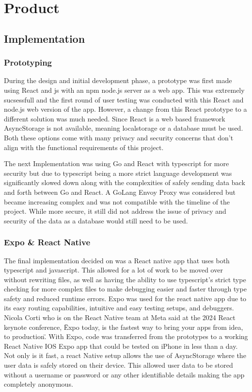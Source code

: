 \section{Product}\label{product}

\subsection{Implementation}

\subsubsection{Prototyping}
During the design and initial development phase, a prototype was first made using React and js with an npm node.js server as a web app. This was extremely sucsessfull and the first round of user testing was conducted with this React and node.js web version of the app. However, a change from this React prototype to a different solution was much needed. Since React is a web based framework AsyncStorage is not available, meaning localstorage or a database must be used. Both these options come with many privacy and security concerns that don't align with the functional requirements of this project.

The next Implementation was using Go and React with typescript for more security but due to typescript being a more strict language development was significantly slowed down along with the complexities of safely sending data back and forth between Go and React. A GoLang Envoy Proxy was considered but became increasing complex and was not compatible with the timeline of the project. While more secure, it still did not address the issue of privacy and security of the data as a database would still need to be used.

\subsubsection{Expo \& React Native}
The final implementation decided on was a React native app that uses both typescript and javascript. This allowed for a lot of work to be moved over without rewriting files, as well as having the ability to use typescript's strict type checking for more complex files to make debugging easier and faster through type safety and reduced runtime errors. Expo was used for the react native app due to its easy routing capabilities, intuitive and easy testing setups, and debuggers. Nicola Corti who is on the React Native team at Meta said at the 2024 React keynote conference, \"Expo today, is the fastest way to bring your apps from idea, to production\". With Expo, code was transferred from the prototypes to a working React Native IOS Expo app that could be tested on iPhone in less than a day. Not only is it fast, a react Native setup allows the use of AsyncStorage where the user data is safely stored on their device. This allowed user data to be stored without a username or password or any other identifiable details making the app completely anonymous. 

